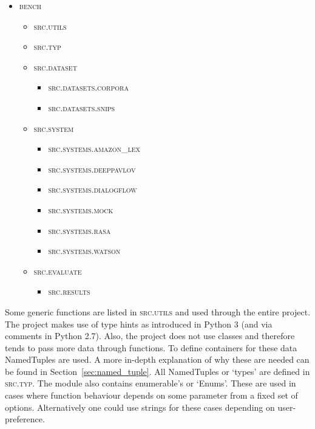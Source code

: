 \begin{itemize}
    \item \textsc{bench}
    \begin{itemize}
        \item \textsc{src.utils}
        \item \textsc{src.typ}
        \item \textsc{src.dataset}
        \begin{itemize}
            \item \textsc{src.datasets.corpora}
            \item \textsc{src.datasets.snips}
        \end{itemize}
        \item \textsc{src.system}
        \begin{itemize}
            \item \textsc{src.systems.amazon\_lex}
            \item \textsc{src.systems.deeppavlov}
            \item \textsc{src.systems.dialogflow}
            \item \textsc{src.systems.mock}
            \item \textsc{src.systems.rasa}
            \item \textsc{src.systems.watson}
        \end{itemize}
        \item \textsc{src.evaluate}
        \begin{itemize}
            \item \textsc{src.results}
        \end{itemize}
    \end{itemize}
\end{itemize}

Some generic functions are listed in \textsc{src.utils} and used through the entire project.
The project makes use of type hints as introduced in Python 3 (and via comments in Python 2.7).
Also, the project does not use classes and therefore tends to pass more data through functions.
To define containers for these data NamedTuples are used.
A more in-depth explanation of why these are needed can be found in Section~\ref{sec:named_tuple}.
All NamedTuples or `types' are defined in \textsc{src.typ}.
The module also contains enumerable's or `Enums'.
These are used in cases where function behaviour depends on some parameter from a fixed set of options.
Alternatively one could use strings for these cases depending on user-preference.

